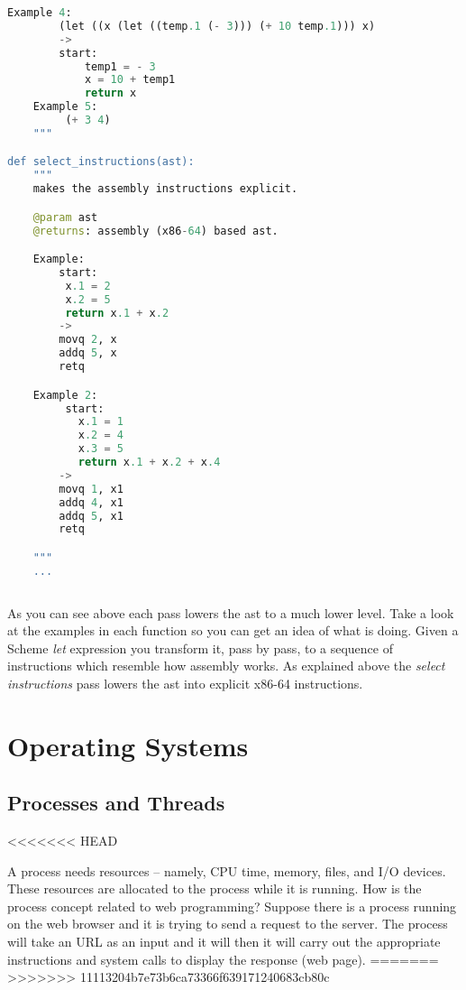 \documentclass{amsbook}
\begin{document}
\begin{lstlisting}[language=python]
    Example 4:
        (let ((x (let ((temp.1 (- 3))) (+ 10 temp.1))) x)
        ->
        start:
            temp1 = - 3
            x = 10 + temp1
            return x
    Example 5:
         (+ 3 4)
    """

def select_instructions(ast):
    """
    makes the assembly instructions explicit.

    @param ast
    @returns: assembly (x86-64) based ast.

    Example:
        start:
         x.1 = 2
         x.2 = 5
         return x.1 + x.2
        ->
        movq 2, x
        addq 5, x
        retq

    Example 2:
         start:
           x.1 = 1
           x.2 = 4
           x.3 = 5
           return x.1 + x.2 + x.4
        ->
        movq 1, x1
        addq 4, x1
        addq 5, x1
        retq

    """
    ...
    
\end{lstlisting}

As you can see above each pass lowers the ast to a much lower level. Take a look at the examples in each function so you can get an idea of what is doing. Given a Scheme \textit{let} expression you transform it, pass by pass, to a sequence of instructions which resemble how assembly works. As explained above the \textit{select instructions} pass lowers the ast into explicit x86-64 instructions.

\chapter{Operating Systems}

\section{Processes and Threads}
<<<<<<< HEAD

A process needs resources -- namely, CPU time, memory, files, and I/O devices. These resources are allocated to the process while it is running. How is the process concept related to web programming? Suppose there is a process running on the web browser and it is trying to send a request to the server. The process will take an URL as an input and it will then it will carry out the appropriate instructions and system calls to display the response (web page).
=======
>>>>>>> 11113204b7e73b6ca73366f639171240683cb80c
\end{document}
